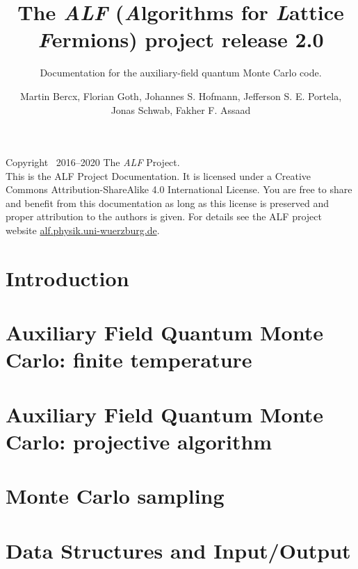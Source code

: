 \documentclass[10pt,Arial]{scrartcl}
\begin{document}
\title{The \emph{ALF} (\emph{A}lgorithms for \emph{L}attice \emph{F}ermions) project release 2.0}

\subtitle{Documentation for the  auxiliary-field quantum Monte Carlo code.}
\author{Martin Bercx,  Florian Goth,  Johannes S. Hofmann, Jefferson S. E. Portela, \\   Jonas Schwab, Fakher F. Assaad }
\maketitle

\noindent Copyright \textcopyright ~2016--2020 The \textit{ALF} Project.\\
This is the ALF Project Documentation. %
It is licensed under a Creative Commons Attribution-ShareAlike 4.0 International License.
You are free to share and benefit from this documentation as long as this license is preserved
and proper attribution to the authors is given. For details see the ALF project
website \url{alf.physik.uni-wuerzburg.de}.
\tableofcontents
\clearpage
\section{Introduction}\label{sec:intro}

\section{Auxiliary Field Quantum Monte Carlo: finite temperature}\label{sec:def}




\section{Auxiliary Field Quantum Monte Carlo: projective algorithm}\label{sec:defT0}

\section{Monte Carlo sampling}\label{sec:sampling}


\section{Data Structures and Input/Output}\label{sec:imp}


\end{document}
